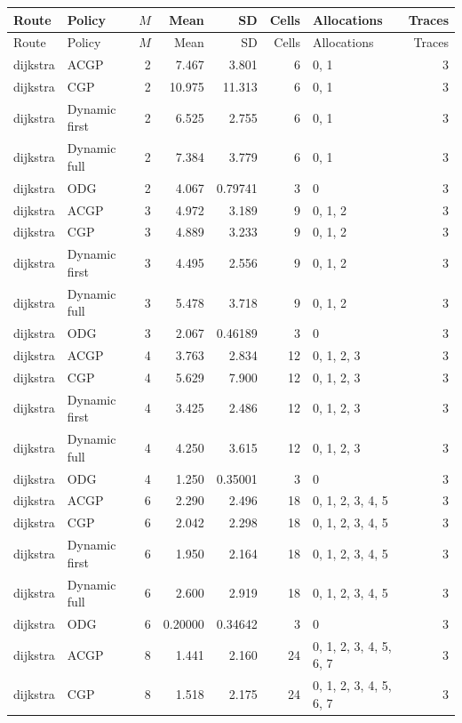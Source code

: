 \documentclass[10pt,a4paper]{article}
\begin{document}
\tiny\setlength{\tabcolsep}{2pt}\begin{longtable}{@{}p{23mm}p{29mm}rrrrp{36mm}r@{}}
\toprule Route & Policy & $M$ & Mean & SD & Cells & Allocations & Traces \\ \midrule\endfirsthead
\toprule Route & Policy & $M$ & Mean & SD & Cells & Allocations & Traces \\ \midrule\endhead
\bottomrule\endfoot
dijkstra & ACGP & 2 & 7.467 & 3.801 & 6 & 0, 1 & 3 \\
dijkstra & CGP & 2 & 10.975 & 11.313 & 6 & 0, 1 & 3 \\
dijkstra & Dynamic first & 2 & 6.525 & 2.755 & 6 & 0, 1 & 3 \\
dijkstra & Dynamic full & 2 & 7.384 & 3.779 & 6 & 0, 1 & 3 \\
dijkstra & ODG & 2 & 4.067 & 0.79741 & 3 & 0 & 3 \\
dijkstra & ACGP & 3 & 4.972 & 3.189 & 9 & 0, 1, 2 & 3 \\
dijkstra & CGP & 3 & 4.889 & 3.233 & 9 & 0, 1, 2 & 3 \\
dijkstra & Dynamic first & 3 & 4.495 & 2.556 & 9 & 0, 1, 2 & 3 \\
dijkstra & Dynamic full & 3 & 5.478 & 3.718 & 9 & 0, 1, 2 & 3 \\
dijkstra & ODG & 3 & 2.067 & 0.46189 & 3 & 0 & 3 \\
dijkstra & ACGP & 4 & 3.763 & 2.834 & 12 & 0, 1, 2, 3 & 3 \\
dijkstra & CGP & 4 & 5.629 & 7.900 & 12 & 0, 1, 2, 3 & 3 \\
dijkstra & Dynamic first & 4 & 3.425 & 2.486 & 12 & 0, 1, 2, 3 & 3 \\
dijkstra & Dynamic full & 4 & 4.250 & 3.615 & 12 & 0, 1, 2, 3 & 3 \\
dijkstra & ODG & 4 & 1.250 & 0.35001 & 3 & 0 & 3 \\
dijkstra & ACGP & 6 & 2.290 & 2.496 & 18 & 0, 1, 2, 3, 4, 5 & 3 \\
dijkstra & CGP & 6 & 2.042 & 2.298 & 18 & 0, 1, 2, 3, 4, 5 & 3 \\
dijkstra & Dynamic first & 6 & 1.950 & 2.164 & 18 & 0, 1, 2, 3, 4, 5 & 3 \\
dijkstra & Dynamic full & 6 & 2.600 & 2.919 & 18 & 0, 1, 2, 3, 4, 5 & 3 \\
dijkstra & ODG & 6 & 0.20000 & 0.34642 & 3 & 0 & 3 \\
dijkstra & ACGP & 8 & 1.441 & 2.160 & 24 & 0, 1, 2, 3, 4, 5, 6, 7 & 3 \\
dijkstra & CGP & 8 & 1.518 & 2.175 & 24 & 0, 1, 2, 3, 4, 5, 6, 7 & 3 \\

\end{longtable}
\end{document}
